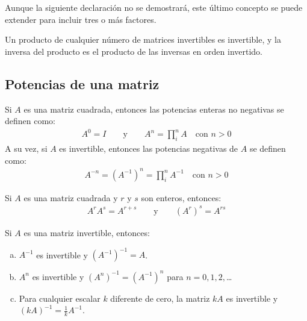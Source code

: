 \documentclass[a4paper,12pt]{article}
\begin{document}
Aunque la siguiente declaración no se demostrará, este último concepto se
puede extender para incluir tres o más factores.
\begin{concept}[i]
  Un producto de cualquier número de matrices invertibles es invertible, y la
  inversa del producto es el producto de las inversas en orden invertido.
\end{concept}

\subsection{Potencias de una matriz}
\begin{concept}
  Si $A$ es una matriz cuadrada, entonces las potencias enteras no negativas
  se definen como:
  \begin{align*}
    A^0=I \qquad \mbox{y} \qquad A^n=\prod_i^nA \quad\mbox{con $n>0$}
  \end{align*}
  A su vez, si $A$ es invertible, entonces las potencias negativas de
  $A$ se definen como:
  \begin{align*}
    A^{-n} = \left( A^{-1} \right)^n = \prod_i^nA^{-1} \quad\mbox{con $n>0$}
  \end{align*}
\end{concept}

\begin{theorem}
  Si $A$ es una matriz cuadrada y $r$ y $s$ son enteros, entonces:
  \begin{align*}
    A^rA^s=A^{r+s} \qquad \mbox{y} \qquad (A^r)^s=A^{rs}
  \end{align*}
  \label{theo:expmatr}
\end{theorem}

\begin{theorem}
  Si $A$ es una matriz invertible, entonces:
  \begin{enumerate}[(a)]
    \item $A^{-1}$ es invertible y $(A^{-1})^{-1}=A$.
    \item $A^n$ es invertible y $(A^n)^{-1}=(A^{-1})^n$ para $n=0,1,2,$\ldots
    \item Para cualquier escalar $k$ diferente de cero, la matriz $kA$ es
      invertible y $(kA)^{-1}=\tfrac{1}{k}A^{-1}$.
  \end{enumerate}
  \label{theo:expmatr2}
\end{theorem}

\demo
\end{document}
